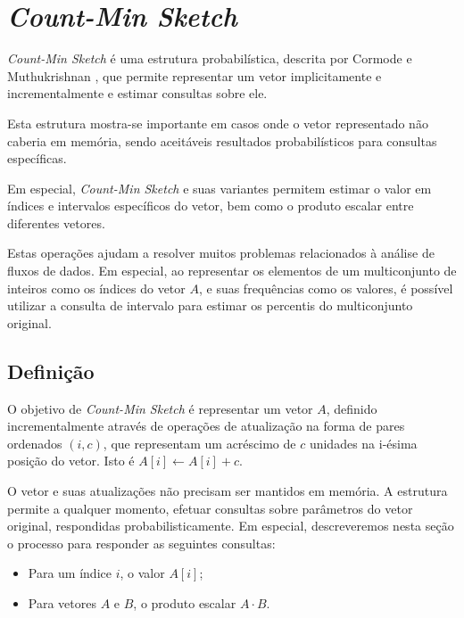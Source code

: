 \section{\emph{Count-Min Sketch}}\label{sec:countmin}

\emph{Count-Min Sketch} é uma estrutura probabilística, descrita por Cormode e Muthukrishnan \cite{cormode2005improved}, que permite representar um vetor implicitamente e incrementalmente e estimar consultas sobre ele. 

Esta estrutura mostra-se importante em casos onde o vetor representado não caberia em memória, sendo aceitáveis resultados probabilísticos para consultas específicas.

Em especial, \emph{Count-Min Sketch} e suas variantes permitem estimar o valor em índices e intervalos específicos do vetor, bem como o produto escalar entre diferentes vetores.

Estas operações ajudam a resolver muitos problemas relacionados à análise de fluxos de dados. Em especial, ao representar os elementos de um multiconjunto de inteiros como os índices do vetor $A$, e suas frequências como os valores, é possível utilizar a consulta de intervalo para estimar os percentis do multiconjunto original.

\subsection{Definição}


O objetivo de \emph{Count-Min Sketch} é representar um vetor $A$,  definido incrementalmente através de operações de atualização na forma de pares ordenados $(i, c)$, que representam um acréscimo de $c$ unidades na i-ésima posição do vetor. Isto é $A[i] \gets A[i] + c$. 

O vetor e suas atualizações não precisam ser mantidos em memória. A estrutura permite a qualquer momento, efetuar consultas sobre parâmetros do vetor original, respondidas probabilisticamente. Em especial, descreveremos nesta seção o processo para responder as seguintes consultas:

\begin{itemize}
  \item Para um índice $i$, o valor $A[i]$;
  \item Para vetores $A$ e $B$, o produto escalar $A \cdot B$.
\end{itemize}

